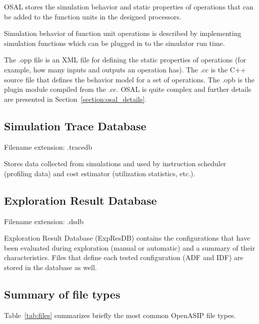 \documentclass[a4paper,twoside]{tceusermanual}
\begin{document}
OSAL stores the simulation behavior and static properties of operations 
that can be added to the function units in the designed processors.

Simulation behavior of function unit operations is described by implementing
simulation functions which can be plugged in to the simulator run time.

The .opp file is an XML file for defining the static properties of
operations (for example, how many inputs and outputs an operation
has). The .cc is the C++ source file that defines the behavior model
for a set of operations. The .opb is the plugin module compiled from
the .cc.  OSAL is quite complex and further details are presented in
Section~\ref{section:osal_details}.


\subsection{Simulation Trace Database}
\label{sec:tracedb}

Filename extension: .tracedb

Stores data collected from simulations and used by instruction scheduler
(profiling data) and cost estimator (utilization statistics, etc.).

\subsection{Exploration Result Database}
\label{sec:expresdb}

Filename extension: .dsdb

Exploration Result Database (ExpResDB) contains the configurations that have
been evaluated during exploration (manual or automatic) and a summary of
their characteristics. Files that define each tested configuration (ADF and
IDF) are stored in the database as well. 



\subsection{Summary of file types}
\label{sec:summary}

Table~\ref{tab:files} summarizes briefly the most common OpenASIP file types.
\end{document}
